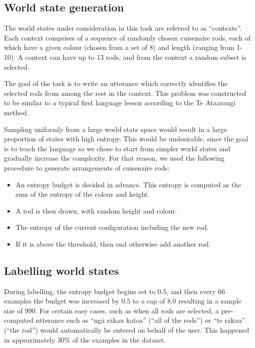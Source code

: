 \subsection{World state generation}

The world states under consideration in this task are referred to as ``contexts''. Each context comprises of a sequence of randomly chosen cuisenaire rods, each of which have a given colour (chosen from a set of 8) and length (ranging from 1-10). A context can have up to 13 rods, and from the context a random subset is selected.

The goal of the task is to write an utterance which correctly identifies the selected rods from among the rest in the context. This problem was constructed to be similar to a typical first language lesson according to the Te Ataarangi method.

Sampling uniformly from a large world state space would result in a large proportion of states with high entropy. This would be undesirable, since the goal is to teach the language so we chose to start from simpler world states and gradually increase the complexity. For that reason, we used the following procedure to generate arrangements of cuisenaire rods:

\begin{itemize}
\item An entropy budget is decided in advance. This entropy is computed as the sum of the entropy of the colour and height.
\item A rod is then drawn, with random height and colour.
\item The entropy of the current configuration including the new rod.
\item If it is above the threshold, then end otherwise add another rod.
\end{itemize}

\subsection{Labelling world states}

During labelling, the entropy budget begins set to 0.5, and then every 66 examples the budget was increased by 0.5 to a cap of 8.0 resulting in a sample size of 990. For certain easy cases, such as when all rods are selected, a pre-computed utterance such as ``ngā rākau katoa'' (``all of the rods'') or ``te rākau'' (``the rod'') would automatically be entered on behalf of the user. This happened in approximately 30\% of the examples in the dataset.

